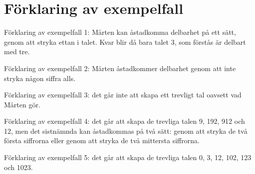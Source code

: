 \section*{Förklaring av exempelfall}
Förklaring av exempelfall 1: Mårten kan åstadkomma delbarhet på ett sätt, genom att stryka ettan i talet. Kvar blir då bara talet 3, som förstås är delbart med tre.

Förklaring av exempelfall 2: Mårten åstadkommer delbarhet genom att inte stryka någon siffra alls.

Förklaring av exempelfall 3: det går inte att skapa ett trevligt tal oavsett vad Mårten gör.

Förklaring av exempelfall 4: det går att skapa de trevliga talen 9, 192, 912 och 12, men det sistnämnda kan åstadkommas på två sätt: genom att stryka de två första siffrorna eller genom att stryka de två mittersta siffrorna.

Förklaring av exempelfall 5: det går att skapa de trevliga talen 0, 3, 12, 102, 123 och 1023.
